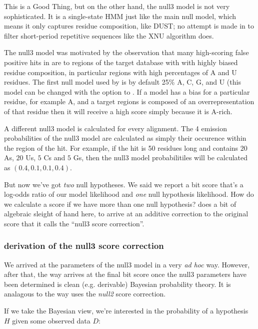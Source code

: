 This is a Good Thing, but on the other hand, the null3 model is not
very sophisticated. It is a single-state HMM just like the main null
model, which means it only captures residue composition, like DUST; no
attempt is made in  to filter short-period repetitive sequences
like the XNU algorithm does. 

The null3 model was motivated by the observation that many
high-scoring false positive hits in  are to regions of
the target database with with highly biased residue composition, in
particular regions with high percentages of A and U residues. The
first null model used by  is by default 25\% A, C,
G, and U (this model can be changed with the  option to
. If a model has a bias for a particular residue, for
example A,  and a target regions is composed of an overrepresentation
of that residue then it will receive a high score simply because it is
A-rich. 


A different null3 model is calculated for every alignment. The 4
emission probabilities of the null3 model are calculated as 
simply their occurence within the region of the hit. For example, if
the hit is 50 residues long and contains $20$ As, $20$ Us, $5$ Cs and $5$ Gs,
then the null3 model probabilitiles will be calculated as $(0.4, 0.1,
0.1, 0.4)$. 

But now we've got \emph{two} null hypotheses. We said we report a bit
score that's a log-odds ratio of our model likelihood and \emph{one}
null hypothesis likelihood. How do we calculate a score if we have
more than one null hypothesis?  does a bit of algebraic sleight
of hand here, to arrive at an additive correction to the original
score that it calls the ``null3 score correction''. 

\subsubsection{derivation of the null3 score correction}

We arrived at the parameters of the null3 model in a very \emph{ad
hoc} way. However, after that, the way  arrives at the final bit
score once the null3 parameters have been determined is clean
(e.g. derivable) Bayesian probability theory. It is analagous to the
way  uses the \emph{null2} score correction.

If we take the Bayesian view, we're interested in the probability of a
hypothesis $H$ given some observed data $D$:

